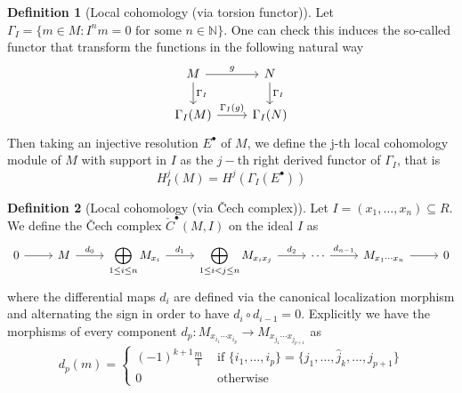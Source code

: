 \documentclass[leqno]{article}
\theoremstyle{definition}
\newtheorem{definition}{Definition}[section]
\begin{document}
\begin{definition}[Local cohomology (via torsion functor)] Let $\Gamma_I= \{m\in M : I^nm = 0 \text{ for some }n\in \mathbb{N} \}$. One can check this induces the so-called functor that transform the functions in the following natural way
\[\begin{tikzcd}
	M & N \\
	{\Gamma_I(M)} & {\Gamma_I(N)}
	\arrow["{\Gamma_I}", from=1-1, to=2-1]
	\arrow["{\Gamma_I}", from=1-2, to=2-2]
	\arrow["g", from=1-1, to=1-2]
	\arrow["{\Gamma_I(g)}", from=2-1, to=2-2]
\end{tikzcd}\]
Then taking an injective resolution $E^\bullet$ of $M$, we define the j-th local cohomology module of $M$ with support in  $I$ as the  $j-$th right derived functor of $\Gamma_I $, that is
\[
H_I^j(M)=H^j(\Gamma _I (E^\bullet) )
\] 
\end{definition}

\begin{definition}[Local cohomology (via \v{C}ech complex)] Let $I=(x_1, \ldots, x_n)\subseteq R$. We define the \v{C}ech complex $\check{C}^{\bullet}(M, I)$ on the ideal $I$ as
\[\begin{tikzcd}
	0 & M & {\displaystyle{\bigoplus_{1\le i\le n} M_{x_i}}} & {\displaystyle{\bigoplus_{1\le i<j\le n} M_{x_ix_j}}} & \cdots & {M_{x_1\cdots x_n}} & 0
	\arrow[from=1-1, to=1-2]
	\arrow["{d_0}", from=1-2, to=1-3]
	\arrow["{d_1}", from=1-3, to=1-4]
	\arrow["{d_2}", from=1-4, to=1-5]
	\arrow["{d_{n-1}}", from=1-5, to=1-6]
	\arrow[from=1-6, to=1-7]
\end{tikzcd}\]
where the differential maps $d_i$ are defined via the canonical localization morphism and alternating the sign in order to have $d_i\circ d_{i-1}=0$. Explicitly we have the morphisms of every component $d_p: M_{x_{i_1}\cdots x_{i_p}} \to M_{x_{j_1}\cdots x_{j_{p+1}}}$ as
\[
  d_p(m) = \begin{cases}
	(-1)^{k+1} \frac{m}{1} &\text{ if } \{i_1, \ldots, i_p\} = \{j_1, \ldots, \hat{j}_k,\ldots, j_{p+1}\}\\ 0 &\text{ otherwise}
  \end{cases}
\] 
\end{definition}
\end{document}
